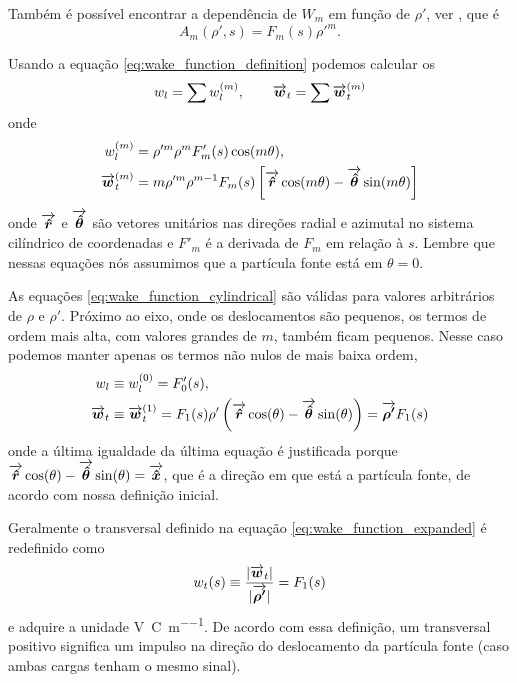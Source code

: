 \documentclass[
	12pt,				%
	openright,			%
	oneside,			%
	a4paper,		%
	chapter=TITLE,		%
	section=TITLE,		%
    brazil,				%
	english,			%
	sumario=tradicional,
	]{abntex2}
\begin{document}
Também é possível encontrar a dependência de $W_m$ em função de $\rho'$,  ver \cite{Bane_PAC1983}, que é
\begin{equation}
	A_m(\rho',s) = F_m(s)\rho'^m.
\end{equation}

Usando a equação \eqref{eq:wake_function_definition} podemos calcular os 
\begin{equation}
	w_l = \sum w_l^{(m)}, \qquad \overrightarrow{\boldsymbol{w}}_t = \sum \overrightarrow{\boldsymbol{w}}_t^{(m)}
\end{equation}
onde
\begin{equation}\label{eq:wake_function_cylindrical}\begin{aligned}
w_l^{(m)} &= \rho'^m\rho^mF'_m(s)\cos(m\theta),\\
\overrightarrow{\boldsymbol{w}}_t^{(m)} &= m\rho'^m\rho^{m-1} F_m(s)\left[\overrightarrow{\boldsymbol{\hat{r}}}\cos(m\theta) -
												  \overrightarrow{\boldsymbol{\hat{\theta}}}\sin(m\theta)\right]
\end{aligned}\end{equation}
onde $\overrightarrow{\boldsymbol{\hat{r}}}$ e $\overrightarrow{\boldsymbol{\hat{\theta}}}$ são vetores unitários nas direções radial e azimutal no sistema cilíndrico de coordenadas e $F'_m$ é a derivada de $F_m$ em relação à $s$. Lembre que nessas equações nós assumimos que a partícula fonte está em $\theta = 0$.

As equações \eqref{eq:wake_function_cylindrical} são válidas para valores arbitrários de $\rho$ e $\rho'$. Próximo ao eixo, onde os deslocamentos são pequenos, os termos de ordem mais alta, com valores grandes de $m$, também ficam pequenos. Nesse caso podemos manter apenas os termos não nulos de mais baixa ordem,
\begin{equation}\label{eq:wake_function_expanded}\begin{aligned}
	w_l & \equiv w_l^{(0)} = F'_0(s), \\
    \overrightarrow{\boldsymbol{w}}_t & \equiv \overrightarrow{\boldsymbol{w}}_t^{(1)} = F_1(s)\rho'\left(\overrightarrow{\boldsymbol{\hat{r}}}\cos(\theta) - \overrightarrow{\boldsymbol{\hat{\theta}}}\sin(\theta)\right) = \overrightarrow{\boldsymbol{\rho'}} F_1(s)
\end{aligned}\end{equation}
onde a última igualdade da última equação é justificada porque $\overrightarrow{\boldsymbol{\hat{r}}}\cos(\theta) - \overrightarrow{\boldsymbol{\hat{\theta}}}\sin(\theta) = \overrightarrow{\boldsymbol{\hat{x}}}$, que é a direção em que está a partícula fonte, de acordo com nossa definição inicial.

Geralmente o  transversal definido na equação \eqref{eq:wake_function_expanded} é redefinido como
\begin{equation}
	w_t(s) \equiv \frac{|\overrightarrow{\boldsymbol{w}}_t|}{|\overrightarrow{\boldsymbol{\rho'}}|} = F_1(s)
\end{equation}
e adquire a unidade \si{\volt\per\coulomb\per\meter}. De acordo com essa definição, um  transversal positivo significa um impulso na direção do deslocamento da partícula fonte (caso ambas cargas tenham o mesmo sinal).
\end{document}
